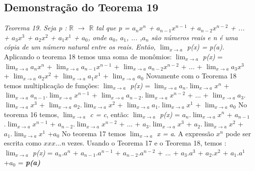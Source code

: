 \subsection{Demonstração do Teorema 19}
\textit{Teorema 19. Seja p : $\mathbb{R}$ $\rightarrow$ $\mathbb{R}$ tal que p = $a_{n}$$x^{n}$ + $a_{n-1}$$x^{n-1}$ + $a_{n-2}$$x^{n-2}$ + ... + $a_{3}$$x^{3}$ + $a_{2}$$x^{2}$ + $a_{1}$$x^{1}$ + $a_{0}$, onde $a_{0}$, $a_{1}$, ... ,$a_{n}$ são números reais e n é uma cópia de um número natural entre os reais. Então, $\lim_{x\rightarrow a}$ p(x) = p(a).}
\newline \newline
Aplicando o teorema 18 temos uma soma de monômios: \newline
$\lim_{x\rightarrow a}$ \textit{p(x)} = $\lim_{x\rightarrow a}$$a_{n}$$x^{n}$ + $\lim_{x\rightarrow a}$$a_{n-1}$$x^{n-1}$ + $\lim_{x\rightarrow a}$$a_{n-2}$$x^{n-2}$ + ... + $\lim_{x\rightarrow a}$$a_{3}$$x^{3}$ + $\lim_{x\rightarrow a}$$a_{2}$$x^{2}$ + $\lim_{x\rightarrow a}$$a_{1}$$x^{1}$ + $\lim_{x\rightarrow a}$$a_{0}$
\newline \newline
Novamente com o Teorema 18 temos multiplicação de funções:  \newline
$\lim_{x\rightarrow a}$ \textit{p(x)} = $\lim_{x\rightarrow a}$$a_{n}$.$\lim_{x\rightarrow a}$$x^{n}$ + $\lim_{x\rightarrow a}$$a_{n-1}$.$\lim_{x\rightarrow a}$$x^{n-1}$ + $\lim_{x\rightarrow a}$$a_{n-2}$.$\lim_{x\rightarrow a}$$x^{n-2}$ + ... + $\lim_{x\rightarrow a}$$a_{3}$.$\lim_{x\rightarrow a}$$x^{3}$ + $\lim_{x\rightarrow a}$$a_{2}$.$\lim_{x\rightarrow a}$$x^{2}$ + $\lim_{x\rightarrow a}$$a_{1}$.$\lim_{x\rightarrow a}$$x^{1}$ + $\lim_{x\rightarrow a}$$a_{0}$ 
\newline \newline
No teorema 16 temos, $\lim_{x\rightarrow a}$ \textit{c = c}, então: 
\newline
$\lim_{x\rightarrow a}$ \textit{p(x)} = $a_{n}$.$\lim_{x\rightarrow a}$$x^{n}$ + $a_{n-1}$.$\lim_{x\rightarrow a}$$x^{n-1}$ + $a_{n-2}$.$\lim_{x\rightarrow a}$$x^{n-2}$ + ... + $a_{3}$.$\lim_{x\rightarrow a}$$x^{3}$ + $a_{2}$.$\lim_{x\rightarrow a}$$x^{2}$ + $a_{1}$.$\lim_{x\rightarrow a}$$x^{1}$ +$a_{0}$ 
\newline \newline
No teorema 17 temos $\lim_{x\rightarrow a}$ \textit{x = a}. A expressão $x^{n}$ pode ser escrita como $x$$x$$x$...\textit{n} vezes. Usando o Teorema 17 e o Teorema 18, temos :\newline
$\lim_{x\rightarrow a}$ \textit{p(x)} = $a_{n}$.$a^{n}$ + $a_{n-1}$.$a^{n-1}$ + $a_{n-2}$.$a^{n-2}$ + ... + $a_{3}$.$a^{3}$ + $a_{2}$.$x^{2}$ + $a_{1}$.$a^{1}$ +$a_{0}$ = \textbf{\textit{p(a)}}
\newline\newline
